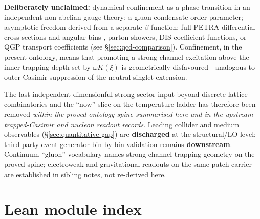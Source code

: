 \documentclass[11pt]{amsart}
\begin{document}
\textbf{Deliberately unclaimed:} dynamical confinement as a phase transition in an
independent non-abelian gauge theory; a gluon condensate order parameter; asymptotic
freedom derived from a separate $\beta$-function; full PETRA differential cross
sections and angular bins \cite{bartel1979,berger1979,peskin1995},
parton showers, DIS coefficient functions, or QGP transport coefficients (see
\S\ref{sec:qcd-comparison}). Confinement, in the present ontology,
means that promoting a strong-channel excitation above the inner trapping depth set by
$\omega K(\xi)$ is geometrically disfavoured---analogous to outer-Casimir suppression
of the neutral singlet extension.

The last independent dimensionful strong-sector input beyond discrete lattice
combinatorics and the ``now'' slice on the temperature ladder has therefore been
removed \emph{within the proved ontology spine summarised here and in the upstream
trapped-Casimir and nucleon readout records}. Leading collider and medium observables
(\S\ref{sec:quantitative-gap}) are \textbf{discharged} at the structural/LO level;
third-party event-generator bin-by-bin validation remains \textbf{downstream}. Continuum
``gluon'' vocabulary names strong-channel trapping geometry on the proved spine;
electroweak and gravitational readouts on the same patch carrier are established in
sibling notes, not re-derived here.

\appendix

\section{Lean module index}
\label{app:lean-index}
\end{document}
